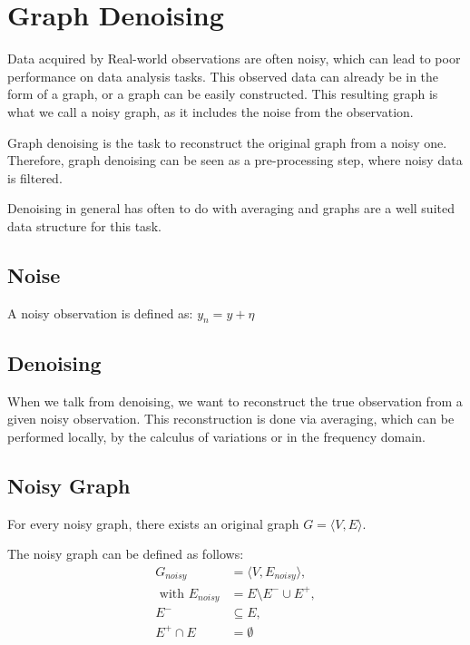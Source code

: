 \section{Graph Denoising}
Data acquired by Real-world observations are often noisy, which can lead to poor 
performance on data analysis tasks. This observed data can already be in the form of a graph,
or a graph can be easily constructed. This resulting graph is what we call
a noisy graph, as it includes the noise from the observation.

Graph denoising is the task to reconstruct the original graph from a noisy one.
Therefore, graph denoising can be seen as a pre-processing step, where noisy data is filtered.

Denoising in general has often to do with averaging 
 and graphs are  a well suited data structure for this task\cite{noneLocalMean}.


\subsection{Noise}
A noisy observation is defined as:
$y_n = y + \eta$

\subsection{Denoising}
When we talk from denoising, we want to reconstruct the true observation 
from a given noisy observation. This reconstruction is done via averaging, which can be performed
locally, by the calculus of variations or in the frequency domain.

\subsection{Noisy Graph}
For every noisy graph, there exists an original graph $G = \langle V,E \rangle$.

The noisy graph can be defined as follows:
\begin{equation}
    \begin{aligned}
        G_{noisy} &= \langle V,E_{noisy} \rangle,  \\ 
        \text{ with }  E_{noisy} &= E \setminus  E^{-} \cup  E^{+}, \\ 
         E^{-} & \subseteq E, \\
         E^{+} \cap E &= \emptyset
    \end{aligned}
\end{equation}

